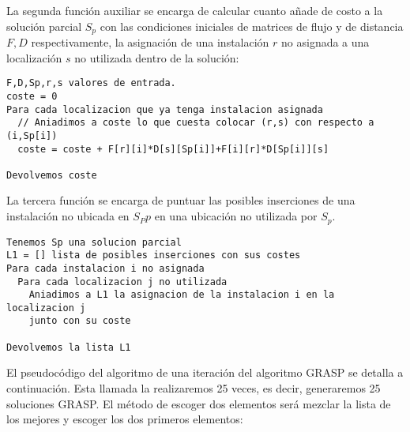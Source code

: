 \noindent\hrulefill

La segunda función auxiliar se encarga de calcular cuanto añade de costo a la solución parcial $S_p$ con las condiciones iniciales de matrices de flujo y de distancia $F,D$ respectivamente, la asignación de una instalación $r$ no asignada a una localización $s$ no utilizada dentro de la solución:\\

\noindent\hrulefill

\begin{lstlisting}
F,D,Sp,r,s valores de entrada.
coste = 0
Para cada localizacion que ya tenga instalacion asignada
  // Aniadimos a coste lo que cuesta colocar (r,s) con respecto a (i,Sp[i])
  coste = coste + F[r][i]*D[s][Sp[i]]+F[i][r]*D[Sp[i]][s]

Devolvemos coste
\end{lstlisting}

\noindent\hrulefill


La tercera función se encarga de puntuar las posibles inserciones de una instalación  no ubicada en $S_Pp$ en una ubicación no utilizada por $S_p$.

\noindent\hrulefill

\begin{lstlisting}
Tenemos Sp una solucion parcial
L1 = [] lista de posibles inserciones con sus costes
Para cada instalacion i no asignada
  Para cada localizacion j no utilizada
    Aniadimos a L1 la asignacion de la instalacion i en la localizacion j
    junto con su coste
    
Devolvemos la lista L1
\end{lstlisting}


\noindent\hrulefill

El pseudocódigo del algoritmo de una iteración del algoritmo GRASP se detalla a continuación. Esta llamada la realizaremos 25 veces, es decir, generaremos 25 soluciones GRASP. El método de escoger dos elementos será mezclar la lista de los mejores y escoger los dos primeros elementos:\\

